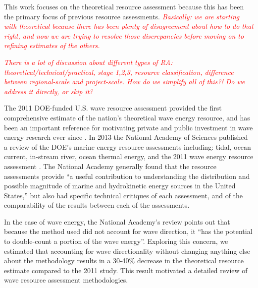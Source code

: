 \documentclass[authoryear,preprint]{elsarticle}
\newcommand{\note}[1]{\textcolor{red}{\em #1}}
\begin{document}
This work focuses on the theoretical resource assessment because this has been
the primary focus of previous resource assessments.
\note{Basically: we are starting with theoretical because there has been plenty of disagreement about how to do that right, and now we are trying to resolve those discrepancies before moving on to refining estimates of the others.}

\note{There is a lot of discussion about different types of RA: theoretical/technical/practical, stage 1,2,3, resource classification, difference between regional-scale and project-scale. How do we simplify all of this?! Do we address it directly, or skip it?}

The 2011 DOE-funded U.S. wave resource assessment provided the first
comprehensive estimate of the nation’s theoretical wave energy resource, and has been an
important reference for motivating private and public investment in wave energy
research ever since \citep[]{EPRIwaveresource2011}. In 2013 the National Academy of Sciences published a
review of the DOE’s marine energy resource assessments including: tidal, ocean
current, in-stream river, ocean thermal energy, and the 2011 wave energy
resource assessment \citep{nationalresearchcouncilEvaluationDepartmentEnergy2013}. The National Academy generally found that the resource
assessments provide “a useful contribution to understanding the distribution and
possible magnitude of marine and hydrokinetic energy sources in the United
States,” but also had specific technical critiques of each assessment, and of
the comparability of the results between each of the assessments.

In the case of wave energy, the National Academy’s review points out that
because the method used did not account for wave direction, it “has the
potential to double-count a portion of the wave energy”. Exploring this concern,
we estimated that accounting for wave directionality without changing anything
else about the methodology results in a 30-40\% decrease in the theoretical
resource estimate compared to the 2011 study. This result motivated a detailed
review of wave resource assessment methodologies.
\end{document}
